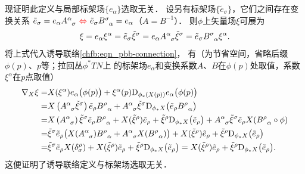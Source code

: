 现证明此定义与局部标架场$\{e_\alpha\}$选取无关．
设另有标架场$\{\tilde{e}_{\sigma}\}$，它们之间存在变换关系
$\tilde{e}_\sigma= e_\alpha A^\alpha_{\hphantom{\alpha}\sigma} {\  \color{red}\Leftrightarrow\  } 
\tilde{e}_\sigma B_{\hphantom{\alpha}\alpha}^\sigma  = e_\alpha$（$A=B^{-1}$）．
则$\phi$上矢量场$\xi$可展为
\begin{equation}
    \xi = e_\alpha \xi^\alpha = \tilde{e}_\sigma \tilde{\xi}^\sigma
    = e_\alpha A^\alpha_{\hphantom{\alpha}\sigma} \tilde{\xi}^\sigma
    = \tilde{e}_\sigma B_{\hphantom{\alpha}\alpha}^\sigma \xi^\alpha .
\end{equation}
将上式代入诱导联络\eqref{chfb:eqn_pbb-connection}，
有（为节省空间，省略后缀$\phi(p)$、$p$等；拉回丛$\phi^*TN$上
的标架场$e_\alpha$和变换系数$A$、$B$在$\phi(p)$处取值，系数$\xi^\alpha$在$p$点取值）
\begin{align*}
    \nabla_X \xi =& X(\xi^\alpha ) e_\alpha\bigl(\phi(p)\bigr)
    +\xi^\alpha(p) \mathrm{D}_{\phi_*(X(p))} e_\alpha\bigl(\phi(p)\bigr) \\
    =& X\left(A^\alpha_{\hphantom{\alpha}\sigma} \tilde{\xi}^\sigma \right) 
    \tilde{e}_\rho B_{\hphantom{\alpha}\alpha}^\rho
    + A^\alpha_{\hphantom{\alpha}\sigma} \tilde{\xi}^\sigma 
    \mathrm{D}_{\phi_*X} \bigl(\tilde{e}_\rho B_{\hphantom{\alpha}\alpha}^\rho\bigr) \\
    =& X\left(A^\alpha_{\hphantom{\alpha}\sigma}  \right) \tilde{\xi}^\sigma
    \tilde{e}_\rho B_{\hphantom{\alpha}\alpha}^\rho
    + X ( \tilde{\xi}^\rho ) \tilde{e}_\rho 
    +  \tilde{\xi}^\rho  \mathrm{D}_{\phi_*X} \bigl(\tilde{e}_\rho \bigr) 
    + A^\alpha_{\hphantom{\alpha}\sigma} \tilde{\xi}^\sigma \tilde{e}_\rho 
    X( B_{\hphantom{\alpha}\alpha}^\rho \circ \phi ) \\
    =& \tilde{\xi}^\sigma \tilde{e}_\rho \bigl(
    X(A^\alpha_{\hphantom{\alpha}\sigma}  ) B_{\hphantom{\alpha}\alpha}^\rho
    + A^\alpha_{\hphantom{\alpha}\sigma} X( B_{\hphantom{\alpha}\alpha}^\rho ) \bigr)
    + X ( \tilde{\xi}^\rho ) \tilde{e}_\rho 
    +  \tilde{\xi}^\rho  \mathrm{D}_{\phi_*X} \bigl(\tilde{e}_\rho \bigr)   \\
    =& \tilde{\xi}^\sigma \tilde{e}_\rho  X( \delta^\rho_\sigma )+
    X ( \tilde{\xi}^\rho ) \tilde{e}_\rho 
    +  \tilde{\xi}^\rho  \mathrm{D}_{\phi_*X} \bigl(\tilde{e}_\rho \bigr)
    =X ( \tilde{\xi}^\rho ) \tilde{e}_\rho 
    +  \tilde{\xi}^\rho  \mathrm{D}_{\phi_*X} \bigl(\tilde{e}_\rho \bigr) .
\end{align*}
这便证明了诱导联络定义与标架场选取无关．



